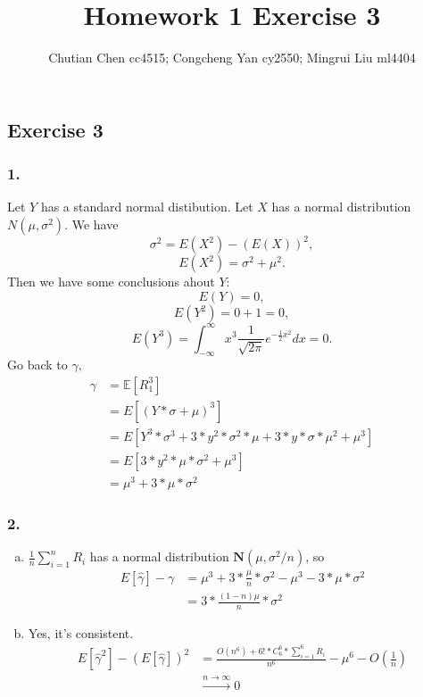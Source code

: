 \documentclass[11pt]{article}
\title{Homework 1 Exercise 3}
\author{Chutian Chen cc4515; Congcheng Yan cy2550; Mingrui Liu ml4404}
\begin{document}
	
\maketitle

\subsection*{Exercise 3}

\subsubsection*{1.}
Let $Y$ has a standard normal distibution. Let $X$ has a normal distribution $N\left(\mu, \sigma^{2}\right)$. We have $$ \sigma^{2} = E(X^2)-(E(X))^2,$$
$$E(X^2) = \sigma^{2} + \mu^{2}.$$
Then we have some conclusions ahout $Y$:
$$E(Y) = 0,$$
$$E(Y^2) = 0 + 1 = 0,$$
$$E(Y^3) = \int_{-\infty}^{\infty} x^{3} \frac{1}{\sqrt{2 \pi}} e^{-\frac{1}{2} x^{2}} d x=0.$$
Go back to ${\gamma},$
\begin{align*}
\gamma&=\mathbb{E}\left[R_{1}^{3}\right]\\
&= E[(Y*\sigma + \mu)^3]\\
&= E[Y^3 * \sigma ^3 + 3*y^2*\sigma ^2 *\mu + 3*y*\sigma*\mu^2 + \mu^3]\\
&= E[3*y^2*\mu*\sigma^2 + \mu^3]\\
&= \mu^3 + 3*\mu*\sigma^2
\end{align*}
\subsubsection*{2.}
\begin{enumerate}[(a)]
\item $\frac{1}{n} \sum_{i=1}^{n} R_{i}$ has a normal distribution $\mathbf{N}\left(\mu, \sigma^{2} / n\right)$, so 
\begin{align*}
E[\hat \gamma]  - \gamma &= \mu^3 + 3*\frac{\mu}{n}*\sigma^2 - \mu^3 - 3*\mu*\sigma^2\\
&= 3*\frac{(1-n)\mu}{n}*\sigma^2
\end{align*}
\item Yes, it's consistent.
\begin{align*}
E[\hat \gamma^2] - (E[\hat \gamma])^2 &= \frac {O(n^6) + 6! * C ^{6}_{6}*\sum \limits_{i=1}^{6}R_i}{n^6} - \mu ^6 - O(\frac{1}{n})\\
&\stackrel{n\rightarrow \infty}{\longrightarrow}0
\end{align*}



\end{enumerate}
\end{document}

